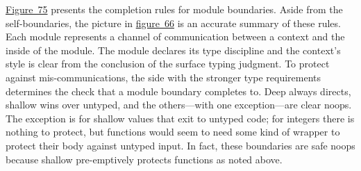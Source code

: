 \documentclass[ twoside,open=right,titlepage,numbers=noenddot,headinclude,%
                footinclude=true,cleardoublepage=empty,abstract=off,
                BCOR=5mm,paper=a4,fontsize=11pt,%
                ngerman,american,%
                parts,pdfspacing]{scrreprt}
\newcommand{\FigureRef}[2]{#1}
\begin{document}
\hyperref[t:x28counter_x28x22figurex22_x22figx3abothx3acompletion2x22x29x29]{Figure~\FigureRef{75}{t:x28counter_x28x22figurex22_x22figx3abothx3acompletion2x22x29x29}} presents the completion rules for module
 boundaries.
Aside from the self{-}boundaries, the picture in \hyperref[t:x28counter_x28x22figurex22_x22figx3abothx3abasex2dinteractionx22x29x29]{figure~\FigureRef{66}{t:x28counter_x28x22figurex22_x22figx3abothx3abasex2dinteractionx22x29x29}}
 is an accurate summary of these rules.
Each module represents a channel of communication between a context and the inside of the module.
The module declares its type discipline and the context{'}s style is clear
 from the conclusion of the surface typing judgment.
To protect against mis{-}communications, the side with the stronger type requirements
 determines the check that a module boundary completes to.
Deep always directs, shallow wins over untyped, and the others{---}with
 one exception{---}are clear noops.
The exception is for shallow values that exit to untyped code;
 for integers there is nothing to protect, but functions would seem to need
 some kind of wrapper to protect their body against untyped input.
In fact, these boundaries are safe noops because shallow pre{-}emptively
 protects functions as noted above.
\end{document}

